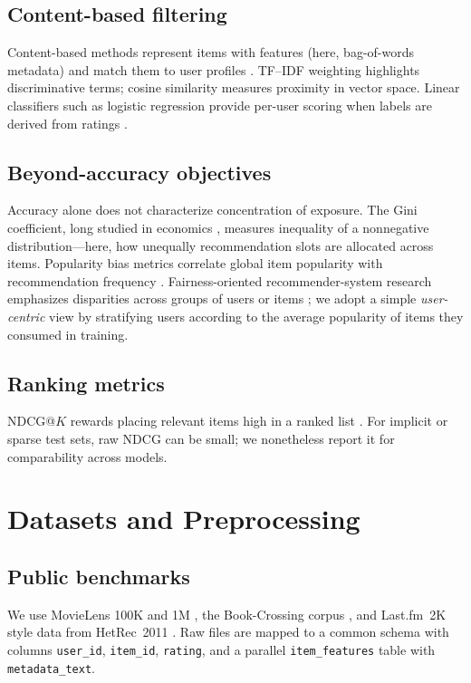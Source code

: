 \documentclass[11pt,a4paper,twoside,openright]{report}
\begin{document}
\section{Content-based filtering}
Content-based methods represent items with features (here, bag-of-words metadata) and match them to user profiles \citep{manning2008introduction}. TF--IDF weighting highlights discriminative terms; cosine similarity measures proximity in vector space. Linear classifiers such as logistic regression provide per-user scoring when labels are derived from ratings \citep{hastie2009elements}.

\section{Beyond-accuracy objectives}
Accuracy alone does not characterize concentration of exposure. The Gini coefficient, long studied in economics \citep{cowell2011measuring}, measures inequality of a nonnegative distribution---here, how unequally recommendation slots are allocated across items. Popularity bias metrics correlate global item popularity with recommendation frequency \citep{abdollahpouri2019managing}. Fairness-oriented recommender-system research emphasizes disparities across groups of users or items \citep{ekstrand2018fairness}; we adopt a simple \emph{user-centric} view by stratifying users according to the average popularity of items they consumed in training.

\section{Ranking metrics}
NDCG@$K$ rewards placing relevant items high in a ranked list \citep{jarvelin2002cumulated}. For implicit or sparse test sets, raw NDCG can be small; we nonetheless report it for comparability across models.

\chapter{Datasets and Preprocessing}

\section{Public benchmarks}
We use MovieLens 100K and 1M \citep{harper2015movielens}, the Book-Crossing corpus \citep{ziegler2005improving}, and Last.fm~2K style data from HetRec~2011 \citep{cantador2011second}. Raw files are mapped to a common schema with columns \texttt{user\_id}, \texttt{item\_id}, \texttt{rating}, and a parallel \texttt{item\_features} table with \texttt{metadata\_text}.
\end{document}
